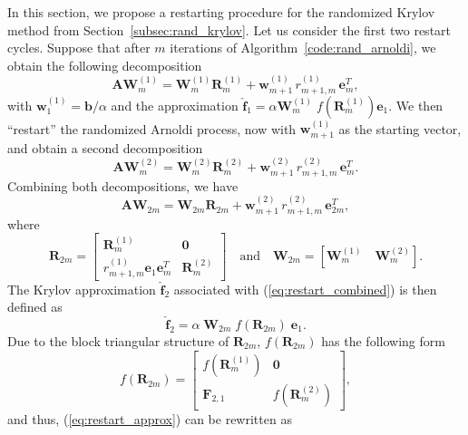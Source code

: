 \documentclass[smallextended]{svjour3}
\renewcommand{\vec}[1]{\mathbf{#1}}
\newcommand{\mat}[1]{\mathbf{#1}}
\begin{document}
In this section, we propose a restarting procedure for the randomized Krylov method from Section~\ref{subsec:rand_krylov}. Let us consider the first two restart cycles. Suppose that after $m$ iterations of Algorithm~\ref{code:rand_arnoldi}, we obtain the following decomposition
\begin{equation*}
\mat{A} \mat{W}_m^{(1)} = \mat{W}_{m}^{(1)} \mat{R}_m^{(1)} + \vec{w}_{m + 1}^{(1)} \, r_{m + 1, m}^{(1)} \, \vec{e}^T_m,
\end{equation*}
with $\vec{w}_1^{(1)} = \vec{b} / \alpha$ and the approximation $\vec{\hat{f}}_1 = \alpha \mat{W}_m^{(1)} \; f(\mat{R}_m^{(1)}) \vec{e}_1$. We then ``restart'' the randomized Arnoldi process, now with $\vec{w}_{m + 1}^{(1)}$ as the starting vector, and obtain a second decomposition
\begin{equation*}
\mat{A} \mat{W}_m^{(2)} = \mat{W}_{m}^{(2)} \mat{R}_m^{(2)} + \vec{w}_{m + 1}^{(2)} \, r_{m + 1, m}^{(2)} \, \vec{e}^T_m.
\end{equation*}
Combining both decompositions, we have
\begin{equation}
\label{eq:restart_combined}
\mat{A} \mat{W}_{2m} =  \mat{W}_{2m} \mat{R}_{2m} + \vec{w}_{m + 1}^{(2)} \, r_{m + 1, m}^{(2)} \, \vec{e}^T_{2m},
\end{equation}
where
\begin{equation*}
\mat{R}_{2m} = \begin{bmatrix} \mat{R}_{m}^{(1)} & \mat{0} \\ r_{m + 1, m}^{(1)} \vec{e}_1\vec{e}_m^T & \mat{R}_{m}^{(2)}  \end{bmatrix} \quad \text{and} \quad \mat{W}_{2m} = [\mat{W}_m^{(1)} \quad \mat{W}_m^{(2)}].
\end{equation*}
The Krylov approximation $\vec{\hat{f}}_2$ associated with (\ref{eq:restart_combined}) is then defined as
\begin{equation}
\label{eq:restart_approx}
\vec{\hat{f}}_{2} = \alpha \; \mat{W}_{2m} \; f(\mat{R}_{2m}) \; \vec{e}_1.
\end{equation}
Due to the block triangular structure of $\mat{R}_{2m}$, $f(\mat{R}_{2m})$ has the following form
\begin{equation*}
f(\mat{R}_{2m}) = \begin{bmatrix} f(\mat{R}_{m}^{(1)}) & \mat{0} \\ \mat{F}_{2, 1}  & f(\mat{R}_{m}^{(2)})  \end{bmatrix},
\end{equation*}
and thus, (\ref{eq:restart_approx}) can be rewritten as
\end{document}
